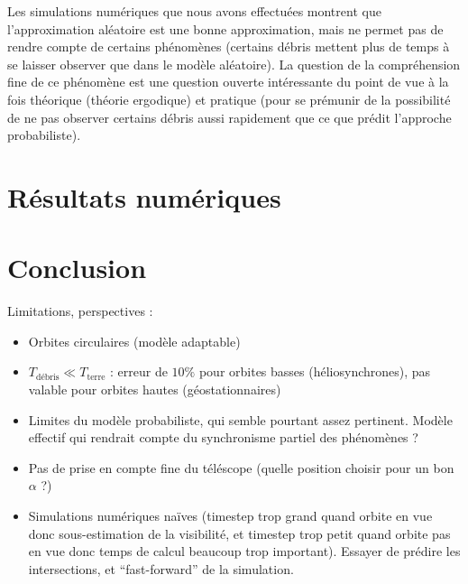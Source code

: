 \documentclass[11pt,a4paper,reqno]{amsart}
\begin{document}
Les simulations numériques que nous avons effectuées montrent que
l'approximation aléatoire est une bonne approximation, mais ne permet
pas de rendre compte de certains phénomènes (certains débris mettent
plus de temps à se laisser observer que dans le modèle aléatoire). La
question de la compréhension fine de ce phénomène est une question
ouverte intéressante du point de vue à la fois théorique (théorie
ergodique) et pratique (pour se prémunir de la possibilité de ne pas
observer certains débris aussi rapidement que ce que prédit l'approche
probabiliste).

\section{Résultats numériques}

\section{Conclusion}
Limitations, perspectives :
\begin{itemize}
\item Orbites circulaires (modèle adaptable)
\item $T_{\text{débris}} \ll T_{\text{terre}}$ : erreur de $10\%$ pour
  orbites basses (héliosynchrones), pas valable pour orbites hautes
  (géostationnaires)
\item Limites du modèle probabiliste, qui semble pourtant assez
  pertinent. Modèle effectif qui rendrait compte du synchronisme
  partiel des phénomènes ?
\item Pas de prise en compte fine du téléscope (quelle position
  choisir pour un bon $\alpha$ ?)
\item Simulations numériques naïves (timestep trop grand quand orbite
  en vue donc sous-estimation de la visibilité, et timestep trop petit
  quand orbite pas en vue donc temps de calcul beaucoup trop
  important). Essayer de prédire les intersections, et
  ``fast-forward'' de la simulation.
\end{itemize}
\end{document}
